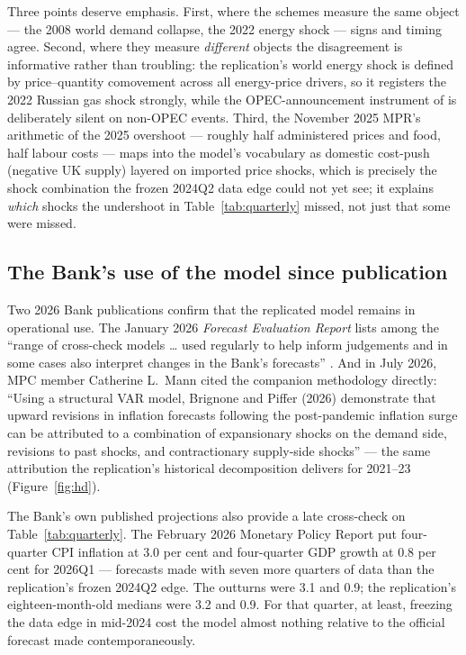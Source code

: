 Three points deserve emphasis. First, where the schemes measure the same object --- the 2008 world demand collapse, the 2022 energy shock --- signs and timing agree. Second, where they measure \emph{different} objects the disagreement is informative rather than troubling: the replication's world energy shock is defined by price--quantity comovement across all energy-price drivers, so it registers the 2022 Russian gas shock strongly, while the OPEC-announcement instrument of \citet{kanzig2021} is deliberately silent on non-OPEC events. Third, the November 2025 MPR's arithmetic of the 2025 overshoot --- roughly half administered prices and food, half labour costs --- maps into the model's vocabulary as domestic cost-push (negative UK supply) layered on imported price shocks, which is precisely the shock combination the frozen 2024Q2 data edge could not yet see; it explains \emph{which} shocks the undershoot in Table~\ref{tab:quarterly} missed, not just that some were missed.

\subsection{The Bank's use of the model since publication}
\label{sec:comparison-use}

Two 2026 Bank publications confirm that the replicated model remains in operational use. The January 2026 \emph{Forecast Evaluation Report} lists \citet{brignone2025} among the ``range of cross-check models \ldots{} used regularly to help inform judgements and in some cases also interpret changes in the Bank's forecasts'' \citep{boe2026fer}. And in July 2026, MPC member Catherine L.\ Mann cited the companion methodology directly: ``Using a structural VAR model, Brignone and Piffer (2026) demonstrate that upward revisions in inflation forecasts following the post-pandemic inflation surge can be attributed to a combination of expansionary shocks on the demand side, revisions to past shocks, and contractionary supply-side shocks'' \citep{mann2026} --- the same attribution the replication's historical decomposition delivers for 2021--23 (Figure~\ref{fig:hd}).

The Bank's own published projections also provide a late cross-check on Table~\ref{tab:quarterly}. The February 2026 Monetary Policy Report put four-quarter CPI inflation at 3.0 per cent and four-quarter GDP growth at 0.8 per cent for 2026Q1 \citep{boe2026mpr_feb} --- forecasts made with seven more quarters of data than the replication's frozen 2024Q2 edge. The outturns were 3.1 and 0.9; the replication's eighteen-month-old medians were 3.2 and 0.9. For that quarter, at least, freezing the data edge in mid-2024 cost the model almost nothing relative to the official forecast made contemporaneously.
